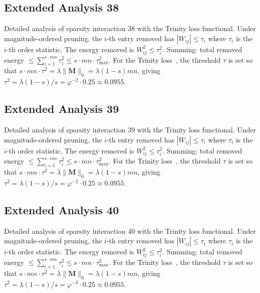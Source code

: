 \subsection{Extended Analysis 38}
\label{subsec:ext-38}

Detailed analysis of sparsity interaction 38 with the Trinity
loss functional.  Under magnitude-ordered pruning, the $i$-th entry removed has
$|W_{ij}| \leq \tau_i$ where $\tau_i$ is the $i$-th order statistic.  The
energy removed is $W_{ij}^2 \leq \tau_i^2$.  Summing: total removed energy
$\leq \sum_{i=1}^{s \cdot mn} \tau_i^2 \leq s \cdot mn \cdot \tau_{\max}^2$.
For the Trinity loss~\cite{hanetal2015deep}, the threshold $\tau$ is set so that
$s \cdot mn \cdot \tau^2 = \lambda \|\mathbf{M}\|_0 = \lambda (1-s) mn$, giving
$\tau^2 = \lambda(1-s)/s = \varphi^{-2} \cdot 0.25 \approx 0.0955$.


\subsection{Extended Analysis 39}
\label{subsec:ext-39}

Detailed analysis of sparsity interaction 39 with the Trinity
loss functional.  Under magnitude-ordered pruning, the $i$-th entry removed has
$|W_{ij}| \leq \tau_i$ where $\tau_i$ is the $i$-th order statistic.  The
energy removed is $W_{ij}^2 \leq \tau_i^2$.  Summing: total removed energy
$\leq \sum_{i=1}^{s \cdot mn} \tau_i^2 \leq s \cdot mn \cdot \tau_{\max}^2$.
For the Trinity loss~\cite{hanetal2015deep}, the threshold $\tau$ is set so that
$s \cdot mn \cdot \tau^2 = \lambda \|\mathbf{M}\|_0 = \lambda (1-s) mn$, giving
$\tau^2 = \lambda(1-s)/s = \varphi^{-2} \cdot 0.25 \approx 0.0955$.


\subsection{Extended Analysis 40}
\label{subsec:ext-40}

Detailed analysis of sparsity interaction 40 with the Trinity
loss functional.  Under magnitude-ordered pruning, the $i$-th entry removed has
$|W_{ij}| \leq \tau_i$ where $\tau_i$ is the $i$-th order statistic.  The
energy removed is $W_{ij}^2 \leq \tau_i^2$.  Summing: total removed energy
$\leq \sum_{i=1}^{s \cdot mn} \tau_i^2 \leq s \cdot mn \cdot \tau_{\max}^2$.
For the Trinity loss~\cite{hanetal2015deep}, the threshold $\tau$ is set so that
$s \cdot mn \cdot \tau^2 = \lambda \|\mathbf{M}\|_0 = \lambda (1-s) mn$, giving
$\tau^2 = \lambda(1-s)/s = \varphi^{-2} \cdot 0.25 \approx 0.0955$.


